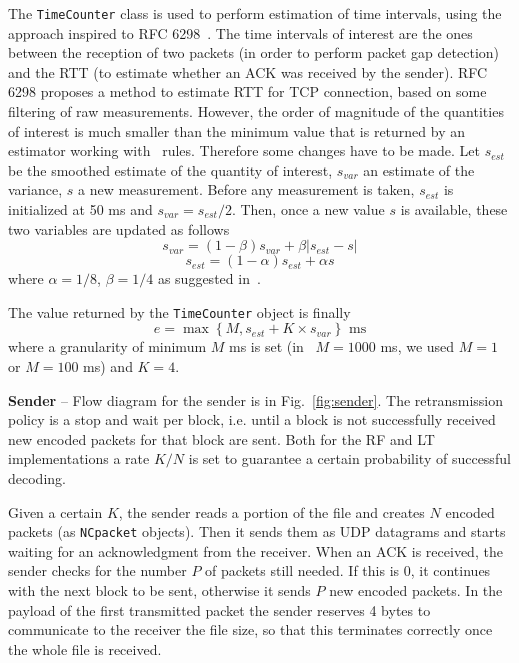 The \texttt{TimeCounter} class is used to perform estimation of time intervals, using the approach inspired to RFC 6298~\cite{rfc6298}. The time intervals of interest are the ones between the reception of two packets (in order to perform packet gap detection) and the RTT (to estimate whether an ACK was received by the sender). RFC 6298 proposes a method to estimate RTT for TCP connection, based on some filtering of raw measurements. However, the order of magnitude of the quantities of interest is much smaller than the minimum value that is returned by an estimator working with~\cite{rfc6298} rules. Therefore some changes have to be made. Let $s_{est}$ be the smoothed estimate of the quantity of interest, $s_{var}$ an estimate of the variance, $s$ a new measurement. Before any measurement is taken, $s_{est}$ is initialized at 50 ms and $s_{var} = s_{est}/2$. Then, once a new value $s$ is available, these two variables are updated as follows
\begin{equation}
	s_{var} = (1-\beta) s_{var}  + \beta |s_{est} - s|
\end{equation}
\begin{equation}
	s_{est} = (1 - \alpha) s_{est} + \alpha s
\end{equation}
where $\alpha = 1/8$, $\beta = 1/4$ as suggested in~\cite{rfc6298}.

The value returned by the \texttt{TimeCounter} object is finally
\begin{equation}
	e = \max\left\{M, s_{est} + K\times s_{var}  \right\} \mbox{ ms}
\end{equation}
where a granularity of minimum $M$ ms is set (in~\cite{rfc6298} $M = 1000$ ms, we used $M = 1$ or $M=100$ ms) and $K = 4$. 

\textbf{Sender} -- Flow diagram for the sender is in Fig.~\ref{fig:sender}. The retransmission policy is a stop and wait per block, i.e. until a block is not successfully received new encoded packets for that block are sent. Both for the RF and LT implementations a rate $K/N$ is set to guarantee a certain probability of successful decoding. 

Given a certain $K$, the sender reads a portion of the file and creates $N$ encoded packets (as \texttt{NCpacket} objects). Then it sends them as UDP datagrams and starts waiting for an acknowledgment from the receiver. When an ACK is received, the sender checks for the number $P$ of packets still needed. If this is 0, it continues with the next block to be sent, otherwise it sends $P$ new encoded packets. In the payload of the first transmitted packet the sender reserves 4 bytes to communicate to the receiver the file size, so that this terminates correctly once the whole file is received. 

